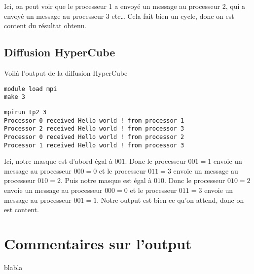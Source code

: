 \documentclass[11pt]{article}
\begin{document}
Ici, on peut voir que le processeur 1 a envoyé un message au processeur 2, qui a envoyé un message au processeur 3 etc\ldots{} Cela fait bien un cycle, donc on est content du résultat obtenu.

\subsection{Diffusion HyperCube}
\label{sec:org65b8a41}

Voilà l'output de la diffusion HyperCube
\begin{verbatim}
module load mpi
make 3
\end{verbatim}

\begin{verbatim}
mpirun tp2 3
Processor 0 received Hello world ! from processor 1
Processor 2 received Hello world ! from processor 3
Processor 0 received Hello world ! from processor 2
Processor 1 received Hello world ! from processor 3
\end{verbatim}



Ici, notre masque est d'abord égal à \(001\). Donc le processeur \(001 = 1\) envoie un message au processeur \(000 = 0\) et le processeur \(011 = 3\) envoie un message au processeur \(010 = 2\).
Puis notre masque est égal à \(010\). Donc le processeur \(010 = 2\) envoie un message au processeur \(000 = 0\) et le processeur \(011 = 3\) envoie un message au processeur \(001 = 1\).
Notre output est bien ce qu'on attend, donc on est content.

\section{Commentaires sur l'output}
\label{sec:orga286471}
blabla
\end{document}
